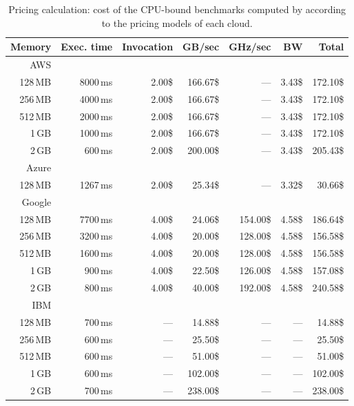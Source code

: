 \begin{table}[!t]
    \caption{Pricing calculation: cost of the CPU-bound benchmarks computed by \sys according to the pricing models of each cloud.
    \label{table:example2}}
    \setlength{\tabcolsep}{3pt}
  \scriptsize
  \center
  \begin{tabular}{r|r|r|r|r|r|r}
  \rowcolor{gray!45}
  \textbf{Memory} & \textbf{Exec. time}  & \textbf{Invocation} & \textbf{GB/sec} & \textbf{GHz/sec} & \textbf{BW} & \textbf{Total} \\
    \hline
  \rowcolor{gray!25}
    AWS  & & & & & &\\
    128\,MB & 8000\,ms &  2.00\$  &  166.67\$  &  --- & 3.43\$ & 172.10\$ \\
    256\,MB & 4000\,ms &  2.00\$  &  166.67\$  &  --- & 3.43\$ & 172.10\$ \\
    512\,MB & 2000\,ms &  2.00\$  &  166.67\$  &  --- & 3.43\$ & 172.10\$ \\
	1\,GB   & 1000\,ms &  2.00\$  &  166.67\$  &  --- & 3.43\$ & 172.10\$ \\
	2\,GB &  600\,ms &  2.00\$  &  200.00\$  &  --- & 3.43\$ & 205.43\$ \\
    \hline
  \rowcolor{gray!25}
    Azure  & & & & & &\\
    128\,MB & 1267\,ms &  2.00\$  &   25.34\$     &  ---        & 3.32\$ &  30.66\$ \\
    \hline
  \rowcolor{gray!25}
    Google  & & & & & &\\
    128\,MB & 7700\,ms &  4.00\$  &   24.06\$     &  154.00\$ & 4.58\$ & 186.64\$ \\
    256\,MB & 3200\,ms &  4.00\$  &   20.00\$     &  128.00\$ & 4.58\$ & 156.58\$ \\
    512\,MB & 1600\,ms &  4.00\$  &   20.00\$     &  128.00\$ & 4.58\$ & 156.58\$ \\
	1\,GB   &  900\,ms &  4.00\$  &   22.50\$     &  126.00\$ & 4.58\$ & 157.08\$ \\
	2\,GB &  800\,ms &  4.00\$  &   40.00\$     &  192.00\$ & 4.58\$ & 240.58\$ \\
    \hline
  \rowcolor{gray!25}
    IBM & & & & & &\\
    128\,MB & 700\,ms &  ---       &   14.88\$     &  ---        & ---      &  14.88\$\\
    256\,MB & 600\,ms &  ---       &   25.50\$     &  ---        & ---      &  25.50\$\\ 
    512\,MB & 600\,ms &  ---       &   51.00\$     &  ---        & ---      &  51.00\$\\ 
	1\,GB   & 600\,ms &  ---       &  102.00\$     &  ---        & ---      &  102.00\$\\
	2\,GB   & 700\,ms &  ---       &  238.00\$     &  ---        & ---      &  238.00\$\\
    \hline
  \end{tabular}
\end{table}

